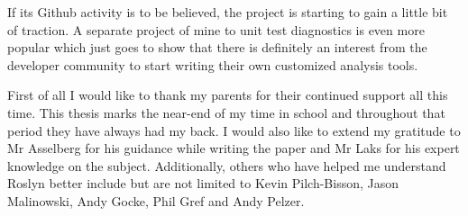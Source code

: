 If its Github activity is to be believed, the project is starting to gain a little bit of traction. A separate project of mine to unit test diagnostics is even more popular which just goes to show that there is definitely an interest from the developer community to start writing their own customized analysis tools.

First of all I would like to thank my parents for their continued support all this time. This thesis marks the near-end of my time in school and throughout that period they have always had my back. I would also like to extend my gratitude to Mr Asselberg for his guidance while writing the paper and Mr Laks for his expert knowledge on the subject. Additionally, others who have helped me understand Roslyn better include but are not limited to Kevin Pilch-Bisson, Jason Malinowski, Andy Gocke, Phil Gref and Andy Pelzer.


\tableofcontents